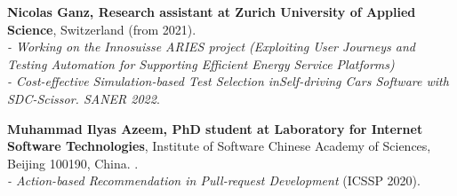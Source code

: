 \documentclass[10pt]{article}
\begin{document}
\begin{bibsection}
\item \textbf{Nicolas Ganz, Research assistant at Zurich University of Applied Science}, Switzerland (from 2021). \\
\textit{- Working on the Innosuisse ARIES project (Exploiting User Journeys and Testing Automation for Supporting Efficient Energy Service Platforms)}\\
\textit{- Cost-effective Simulation-based Test Selection inSelf-driving Cars Software with SDC-Scissor.  SANER 2022}. 

\item \textbf{Muhammad Ilyas Azeem, PhD student at Laboratory for Internet Software Technologies}, Institute of Software Chinese Academy of Sciences, Beijing 100190, China. .\\
       \textit{- Action-based Recommendation in Pull-request Development}  (ICSSP 2020).\\


\end{bibsection}
\end{document}
